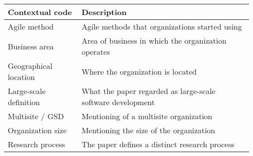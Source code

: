  \label{contextcodetable}
\begin{center}
    \begin{tabular}{l l }
        \bfseries{Contextual code} & \bfseries{Description} \\
        \hline
        Agile method & Agile methods that organizations started using \\
        Business area & Area of business in which the organization operates \\
        Geographical location & Where the organization is located \\
        Large-scale definition & What the paper regarded as large-scale software development \\
        Multisite / GSD & Mentioning of a multisite organization \\
        Organization size & Mentioning the size of the organization \\
        Research process & The paper defines a distinct research process \\
    \end{tabular}
\end{center}

